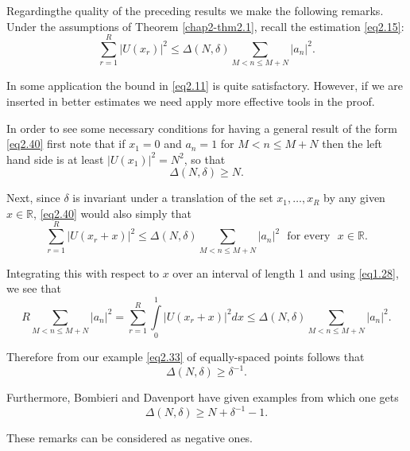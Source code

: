 Regarding\pageoriginale the quality of the preceding results we make
the following 
remarks. Under the assumptions of Theorem \ref{chap2-thm2.1}, recall
the estimation \eqref{eq2.15}: 
\begin{equation*}
\sum_{r=1}^{R}|U(x_r)|^2 \le \Delta (N, \delta ) \sum_{M < n \le
  M+N}|a_n|^2. \tag{2.40}\label{eq2.40} 
\end{equation*}

In some application the bound in \eqref{eq2.11} is quite
satisfactory. However, if we are inserted in better estimates we need
apply more effective tools in the proof.  

In order to see some necessary conditions for having a general result
of the form \eqref{eq2.40} first note that if $x_1=0$ and $a_n=1$ for $M < n
\le M+N$ then the left hand side is at least $|U(x_1)|^2 =N^2$, so that 
\begin{equation*}
\Delta (N, \delta) \ge N.\tag{2.41}\label{eq2.41}
\end{equation*}

Next, since $\delta$ is invariant under a translation of the set $x_1,
\ldots, x_R$ by any given $x \in \mathbb{R}$, \eqref{eq2.40} would also
simply that 
\begin{equation*}
\sum_{r=1}^{R}|U(x_r +x)|^2 \leq \Delta (N,\delta ) \sum_{M < n
  \leq M+N} |a_n|^2 \text{~ for every~ } x \in
\mathbb{R}. \tag{2.42}\label{eq2.42}  
\end{equation*} 

Integrating this with respect to $x$ over an interval of length 1 and
using \eqref{eq1.28}, we see that  
\begin{equation*}
R \sum_{M < n \leq M+N}|a_n|^2 = \sum_{r=1}^{R} \int\limits_{0}^{1}|U
(x_r +x)|^2 dx \leq \Delta (N, \delta ) \sum_{M< n \leq
  M+N}|a_n|^2. \tag{2.43} \label{eq2.43}
\end{equation*}

Therefore from our example \eqref{eq2.33} of equally-spaced points follows
that  
\begin{equation*}
\Delta (N, \delta )\geq \delta^{-1}. \tag{2.44}\label{eq2.44}
\end{equation*}

Furthermore, Bombieri and Davenport \cite{key3} have given examples from
which one gets 
\begin{equation*}
\Delta (N, \delta )\ge N+\delta^{-1} -1. \tag{2.45}\label{eq2.45}
\end{equation*}

These remarks can be considered as negative ones.


